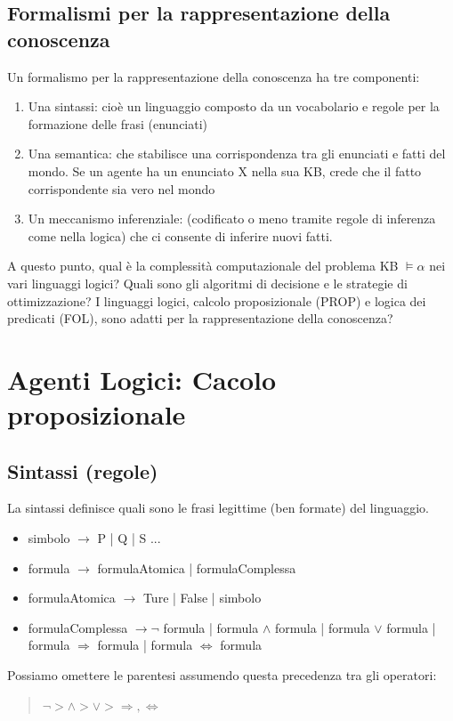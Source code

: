 \documentclass{article}
\begin{document}
\subsection{Formalismi per la rappresentazione della conoscenza}
Un formalismo per la rappresentazione della conoscenza ha tre componenti:
\begin{enumerate}
    \item Una sintassi: cioè un linguaggio composto da un vocabolario e regole per la formazione delle frasi (enunciati)
    \item Una semantica: che stabilisce una corrispondenza tra gli enunciati e fatti del mondo. Se un agente ha un enunciato X nella sua KB, crede che il fatto corrispondente sia vero nel mondo
    \item Un meccanismo inferenziale: (codificato o meno tramite regole di inferenza come nella logica) che ci consente di inferire nuovi fatti. 
\end{enumerate}
A questo punto, qual è la complessità computazionale del problema KB $\models \alpha$ nei vari linguaggi logici? Quali sono gli algoritmi di decisione e le strategie di ottimizzazione? I linguaggi logici, calcolo proposizionale (PROP) e logica dei predicati (FOL), sono adatti per la rappresentazione della conoscenza?
\section{Agenti Logici: Cacolo proposizionale}
\subsection{Sintassi (regole)}
La sintassi definisce quali sono le frasi legittime (ben formate) del linguaggio.
\begin{itemize}
    \item simbolo $\to$ P | Q | S ...
    \item formula $\to$ formulaAtomica | formulaComplessa
    \item formulaAtomica $\to$ Ture | False | simbolo
    \item formulaComplessa $\to \neg$ formula | formula $\land$ formula | formula $\lor$ formula | formula $\Rightarrow$ formula | formula $\Leftrightarrow$ formula
\end{itemize}
Possiamo omettere le parentesi assumendo questa precedenza tra gli operatori:
\begin{quote}
    $\neg  >  \land  >  \lor  >  \Rightarrow, \Leftrightarrow$
\end{quote}
\end{document}
